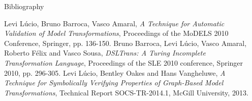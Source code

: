 \documentclass[final,hyperref={pdfpagelabels=false}]{beamer}
\begin{document}
\begin{frame}{}
\begin{columns}[t]
\begin{column}{.485\linewidth}
    \end{column}
    \begin{column}{.485\linewidth}
    	\begin{block}{Bibliography}
    	   \footnotesize
    	   \begin{thebibliography}{10}   
    	    Levi L\'ucio, Bruno Barroca, Vasco Amaral, {\em A
    	   Technique for Automatic Validation of Model Transformations},
    	   Proceedings of the MoDELS 2010 Conference, Springer, pp. 136-150.
    	    Bruno Barroca, Levi L\'ucio, Vasco Amaral, Roberto
    	   F{\'e}lix and Vasco Sousa, {\em DSLTrans: A Turing Incomplete
    	   Transformation Language}, Proceedings of the SLE 2010 conference,
    	   Springer 2010, pp. 296-305.
 		    Levi L\'ucio, Bentley Oakes and Hans Vangheluwe, {\em A Technique for Symbolically Verifying Properties of Graph-Based Model Transformations},  Technical Report SOCS-TR-2014.1, McGill University, 2013.
		\vspace{1.65cm}
		\end{thebibliography}	   
    	\end{block}        
    \end{column}    
   \end{columns}

  \end{frame}
\end{document}
